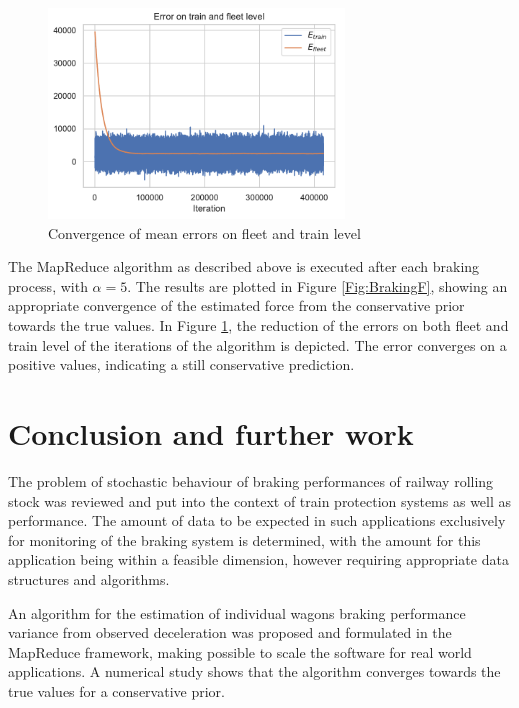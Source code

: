 \documentclass[a4paper, 12pt]{scrartcl}
\begin{document}
\begin{figure}
\begin{center}
\includegraphics[width = 0.7\textwidth]{190121Errors}
\caption{Convergence of mean errors on fleet and train level}
\label{Fig:BrakingError}
\end{center}
\end{figure}

The MapReduce algorithm as described above is executed after each braking process, with $\alpha = 5$. The results are plotted in Figure \ref{Fig:BrakingF}, showing an appropriate convergence of the estimated force from the conservative prior  towards the true values. In Figure \ref{Fig:BrakingError}, the reduction of the errors on both fleet and train level of the iterations of the algorithm is depicted. The error converges on a positive values, indicating a still conservative prediction.

\section{Conclusion and further work}
The problem of stochastic behaviour of braking performances of railway rolling stock was reviewed and put into the context of train protection systems as well as performance. The amount of data to be expected in such applications exclusively for monitoring of the braking system is determined, with the amount for this application being within a feasible dimension, however requiring appropriate data structures and algorithms.

An algorithm for the estimation of individual wagons braking performance variance from observed deceleration was proposed and formulated in the MapReduce framework, making possible to scale the software for real world applications. A numerical study shows that the algorithm converges towards the true values for a conservative prior.
\end{document}
